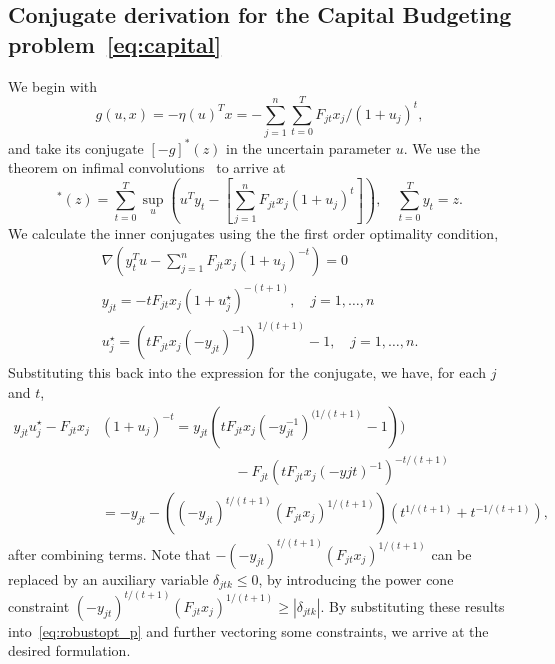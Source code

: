\documentclass[12pt]{article}
\newcommand{\citep}{\cite}
\theoremstyle{thmstyleone}%
\theoremstyle{thmstyletwo}%
\theoremstyle{thmstylethree}%
\begin{document}
\begin{appendices}
\section{Conjugate derivation for the Capital Budgeting problem~\eqref{eq:capital}}
\fi
\label{app:capital}
We begin with
\begin{equation*}
g(u,x) = -\eta(u)^Tx = -\sum_{j = 1}^n \sum_{t = 0}^T F_{jt}x_j/(1+u_j)^{t},
\end{equation*}
and take its conjugate $[-g]^*(z)$ in the uncertain parameter $u$. We use the theorem on infimal convolutions~\citep[Theorem 11.23(a), p. 493]{rockafellar_wets_1998} to arrive at
\begin{equation*}
	[-g]^*(z) = \sum_{t = 0}^T \sup_{u} \left( u^Ty_t -  \left[\sum_{j = 1}^n F_{jt}x_j(1+ u_j)^t\right]\right), \quad \sum_{t = 0}^T y_t = z.
	\end{equation*}
We calculate the inner conjugates using the the first order optimality condition,
\begin{align*}
\nabla \left(y_t^Tu - \sum_{j = 1}^n F_{jt}x_j(1+ u_j)^{-t}\right) = 0 \\
y_{jt} = -tF_{jt}x_j(1+u_j^\star)^{-(t+1)}, \quad j = 1,\dots,n \\
u_j^\star = (tF_{jt}x_j(-y_{jt})^{-1})^{1/(t+1)} - 1, \quad j = 1,\dots,n.
\end{align*}
Substituting this back into the expression for the conjugate, we have, for each $j$ and $t$,
\begin{align*}
	y_{jt}u_j^\star - F_{jt}x_j&(1+u_j)^{-t} = y_{jt}(tF_{jt}x_j(-y_{jt}^{-1})^{(1/(t+1)} - 1)) \\
	&\hspace{4cm} - F_{jt}(tF_{jt}x_j(-y{jt})^{-1})^{-t/(t+1)}\\
&= -y_{jt} - ((-y_{jt})^{t/(t+1)}(F_{jt}x_j)^{1/(t+1)})(t^{1/(t+1)} + t^{-1/(t+1)}),
	\end{align*}
after combining terms. Note that $-(-y_{jt})^{t/(t+1)}(F_{jt}x_j)^{1/(t+1)}$ can be replaced by an auxiliary variable $\delta_{jtk} \leq 0$, by introducing the power cone constraint $(-y_{jt})^{t/(t+1)}(F_{jt}x_j)^{1/(t+1)} \geq |\delta_{jtk} |$. By substituting these results into~\eqref{eq:robustopt_p} and further vectoring some constraints, we arrive at the desired formulation.

\ifpreprint \else
\end{appendices}
\fi
\end{document}
